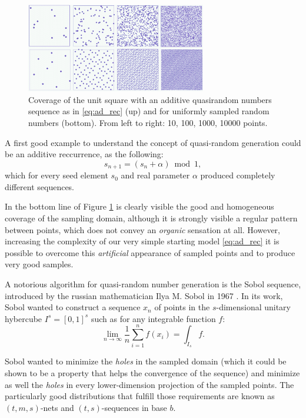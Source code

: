     \begin{figure}
        \centering
        \includegraphics[width = 0.7\textwidth]{images/Subrandom_2D}
        \caption{Coverage of the unit square with an additive quasirandom numbers sequence as in \ref{eq:ad_rec} (up) and for uniformly sampled random numbers (bottom). From left to right: 10, 100, 1000, 10000 points.}
        \label{fig:Subrandom_2D}
    \end{figure}

    A first good example to understand the concept of quasi-random generation could be an additive reccurrence, as the following:
    \begin{equation}
        s_{n+1} = ( s_n + \alpha ) \bmod 1,
        \label{eq:ad_rec}
    \end{equation}
    which for every seed element $s_0$ and real parameter $\alpha$ produced completely different sequences.

    In the bottom line of Figure \ref{fig:Subrandom_2D} is clearly visible the good and homogeneous coverage of the sampling domain, although it is strongly visible a regular pattern between points, which does not convey an \textit{organic} sensation at all. However, increasing the complexity of our very simple starting model \ref{eq:ad_rec} it is possible to overcome this \textit{artificial} appearance of sampled points and to produce very good samples.

    A notorious algorithm for quasi-random number generation is the Sobol sequence, introduced by the russian mathematician Ilya M. Sobol in 1967 \cite{SOBOL2001271}. In its work, Sobol wanted to construct a sequence $x_n$ of points in the $s$-dimensional unitary hybercube $I^s = [0,1]^s$ such as for any integrable function $f$:
    \begin{equation}
        \lim_{n\to\infty} \frac{1}{n} \sum_{i=1}^{n} f(x_i) = \int_{I_s} f.
    \end{equation}

    Sobol wanted to minimize the \textit{holes} in the sampled domain (which it could be shown to be a property that helps the convergence of the sequence) and minimize as well the \textit{holes} in every lower-dimension projection of the sampled points. The particularly good distributions that fulfill those requirements are known as $(t,m,s)$-nets and $(t,s)$-sequences in base $b$.

